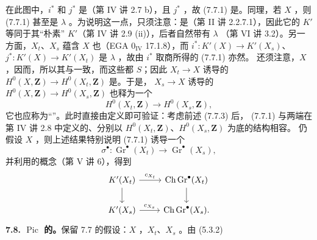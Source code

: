 在此图中，$i^*$ 和 $j^*$ 是（第 IV 讲 2.7 b），且 $j^*$ ，故 (7.7.1) 是。同理，若 $X$ ，则 (7.7.1) 甚至是 $\lambda$ 。为说明这一点，只须注意：是（第 II 讲 2.2.7.1），因此它的 $K'$ 等同于其“朴素” $K'$（第 IV 讲 2.9 (ii)），后者自然带有 $\lambda$ （第 VI 讲 3.2）。另一方面，$X_t$、$X_s$ 蕴含 $X$ 也（EGA $0_{\mathrm{IV}}$ 17.1.8），而 $i^*:K'(X)\to K'(X_s)$、$j^*:K'(X)\to K'(X_t)$ 是 $\lambda$ ，故由 $i^*$ 取商所得的 (7.7.1) 亦然。
还须注意，$X$ ，因而，所以其与一致，而这些都 $S$；因此 $X_t\to X$ 诱导的 $H^0(X,\mathbf Z)\to H^0(X_t,\mathbf Z)$ 是。于是， $X_s\to X$ 诱导的 $H^0(X,\mathbf Z)\to H^0(X_s,\mathbf Z)$ 也释为一个
\[H^0(X_t,\mathbf Z)\longrightarrow H^0(X_s,\mathbf Z),\tag{7.7.3}\]
它也应称为“”。此时直接由定义即可验证：考虑前述 (7.7.3) 后， (7.7.1) 与两端在第 IV 讲 2.8 中定义的、分别以 $H^0(X_t,\mathbf Z)$、$H^0(X_s,\mathbf Z)$ 为底的结构相容。
仍假设 $X$ ，则上述结果特别说明 (7.7.1) 诱导一个
\[\sigma^\bullet:\operatorname{Gr}^{\bullet}(X_t)\longrightarrow\operatorname{Gr}^{\bullet}(X_s),\tag{7.7.4}\]
并利用的概念（第 V 讲 6），得到
\[\begin{tikzcd}K'(X_t)\arrow[r,"c_{X_t}"]\arrow[d]&\operatorname{Ch}\operatorname{Gr}^{\bullet}(X_t)\arrow[d]\\K'(X_s)\arrow[r,"c_{X_s}"]&\operatorname{Ch}\operatorname{Gr}^{\bullet}(X_s).\end{tikzcd}\]
\textbf{7.8. $\operatorname{Pic}$ 的。}保留 7.7 的假设：$X$ ，$X_t$、$X_s$ 。由 (5.3.2)
